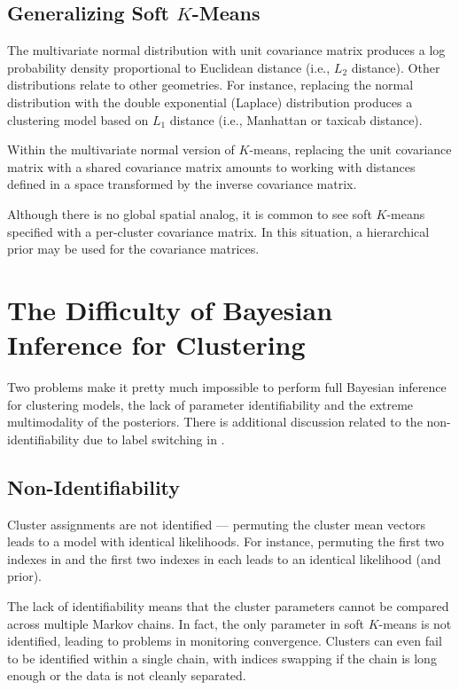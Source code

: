 \subsection{Generalizing Soft $K$-Means}

The multivariate normal distribution with unit covariance matrix
produces a log probability density proportional to Euclidean distance
(i.e., $L_2$ distance).  Other distributions relate to other
geometries.  For instance, replacing the normal distribution with the
double exponential (Laplace) distribution produces a clustering model
based on $L_1$ distance (i.e., Manhattan or taxicab
distance). 

Within the multivariate normal version of $K$-means, replacing the
unit covariance matrix with a shared covariance matrix amounts to
working with distances defined in a space transformed by the inverse
covariance matrix.

Although there is no global spatial analog, it is common to see soft
$K$-means specified with a per-cluster covariance matrix. In this
situation, a hierarchical prior may be used for the covariance matrices.



\section{The Difficulty of Bayesian Inference for Clustering}

Two problems make it pretty much impossible to perform full Bayesian
inference for clustering models, the lack of parameter identifiability
and the extreme multimodality of the posteriors.  There is additional
discussion related to the non-identifiability due to label switching
in .

\subsection{Non-Identifiability}

Cluster assignments are not identified --- permuting the cluster mean
vectors  leads to a model with identical likelihoods.  For
instance, permuting the first two indexes in  and the first
two indexes in each  leads to an identical likelihood
(and prior).

The lack of identifiability means that the cluster parameters
cannot be compared across multiple Markov chains.  In fact, the only
parameter in soft $K$-means is not identified, leading to problems in
monitoring convergence.  Clusters can even fail to be identified
within a single chain, with indices swapping if the chain is long
enough or the data is not cleanly separated. 

